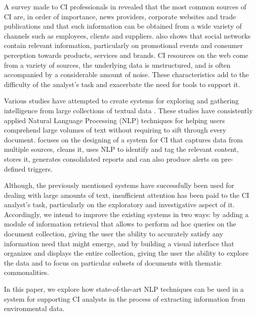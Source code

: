 \documentclass[a4paper]{article}
\begin{document}
A survey made to CI professionals in \citet{marin2004} revealed that the most common sources of CI are, in order of importance, news providers, corporate websites and trade publications and that such information can be obtained from a wide variety of channels such as employees, clients and suppliers. \citet{dey2011} also shows that social networks contain relevant information, particularly on promotional events and consumer perception towards products, services and brands. CI resources on the web come from a variety of sources, the underlying data is unstructured, and is often accompanied by a considerable amount of noise. These characteristics add to the difficulty of the analyst's task and exacerbate the need for tools to support it.

Various studies have attempted to create systems for exploring and gathering intelligence from large collections of textual data \citep{ji2019, lafia2019, lafia2021a, dey2011}. These studies have consistently applied Natural Language Processing (NLP) techniques for helping users comprehend large volumes of text without requiring to sift through every document. \citet{dey2011} focuses on the designing of a system for CI that captures data from multiple sources, cleans it, uses NLP to identify and tag the relevant content, stores it, generates consolidated reports and can also produce alerts on pre-defined triggers. 

Although, the previously mentioned systems have successfully been used for dealing with large amounts of text, insufficient attention has been paid to the CI analyst's task, particularly on the exploratory and investigative aspect of it. Accordingly, we intend to improve the existing systems in two ways: by adding a module of information retrieval that allows to perform ad hoc queries on the document collection, giving the user the ability to accurately satisfy any information need that might emerge, and by building a visual interface that organizes and displays the entire collection, giving the user the ability to explore the data and to focus on particular subsets of documents with thematic commonalities.

In this paper, we explore how state-of-the-art NLP techniques can be used in a system for supporting CI analysts in the process of extracting information from environmental data. 
\end{document}
